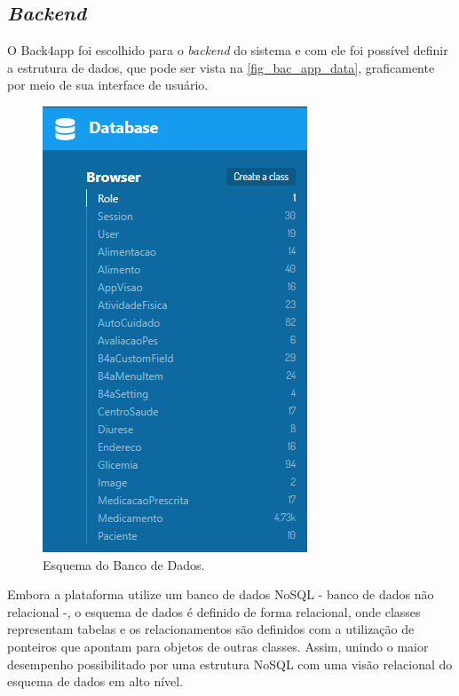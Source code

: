 \subsection{\emph{Backend}}

O Back4app foi escolhido para o \emph{backend} do sistema e com ele foi possível definir a estrutura de dados, que pode
ser vista na \autoref{fig_bac_app_data}, graficamente por meio de sua interface de usuário.

\begin{figure}[htb]
    \caption{\label{fig_bac_app_data}Esquema do Banco de Dados.}
    \begin{center}
        \includegraphics[scale=1.1]{Imagens/desenvolvimento/back4app_database.png}
    \end{center}
\end{figure}

Embora a plataforma utilize um banco de dados NoSQL - banco de dados não relacional -, o esquema de dados
é definido de forma relacional, onde classes representam tabelas e os relacionamentos são definidos com a utilização
de ponteiros que apontam para objetos de outras classes. Assim, unindo o maior desempenho possibilitado por uma
estrutura NoSQL com uma visão relacional do esquema de dados em alto nível.

\newpage

